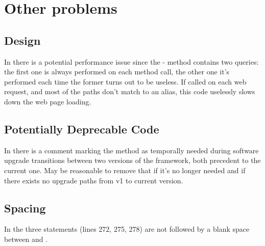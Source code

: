 \section{Other problems}

\subsection{Design}
In  there is a potential performance issue since the - method contains two queries: the first one is always performed on each method call, the other one it's performed each time the former turns out to be useless. If called on each web request, and most of the paths don't match to an alias, this code uselessly slows down the web page loading.

\subsection{Potentially Deprecable Code}
In  there is a comment marking the  method as temporally needed during software upgrade transitions between two versions of the framework, both precedent to the current one. May be reasonable to remove that if it's no longer needed and if there exists no upgrade paths from v1 to current version.

\subsection{Spacing}
In  the three  statements (lines 272, 275, 278) are not followed by a blank space between  and .